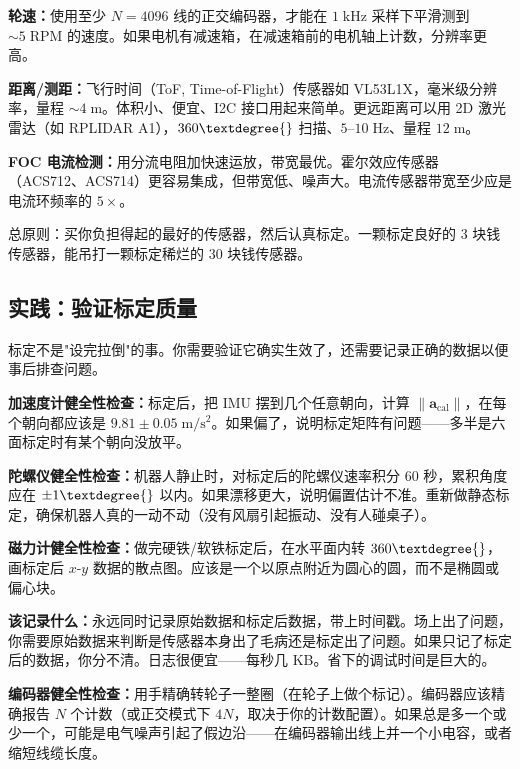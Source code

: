 \textbf{轮速：}使用至少 $N = 4096$ 线的正交编码器，才能在 $1\;\mathrm{kHz}$ 采样下平滑测到 $\sim\!5\;\mathrm{RPM}$ 的速度。如果电机有减速箱，在减速箱前的电机轴上计数，分辨率更高。

\textbf{距离/测距：}飞行时间（ToF, Time-of-Flight）传感器如 VL53L1X，毫米级分辨率，量程 $\sim\!4\;\mathrm{m}$。体积小、便宜、I2C 接口用起来简单。更远距离可以用 2D 激光雷达（如 RPLIDAR A1），$360\textdegree{}$ 扫描、$5$--$10\;\mathrm{Hz}$、量程 $12\;\mathrm{m}$。

\textbf{FOC 电流检测：}用分流电阻加快速运放，带宽最优。霍尔效应传感器（ACS712、ACS714）更容易集成，但带宽低、噪声大。电流传感器带宽至少应是电流环频率的 $5\times$。

总原则：买你负担得起的最好的传感器，然后认真标定。一颗标定良好的 3 块钱传感器，能吊打一颗标定稀烂的 30 块钱传感器。

\subsection{实践：验证标定质量}

标定不是"设完拉倒"的事。你需要验证它确实生效了，还需要记录正确的数据以便事后排查问题。

\textbf{加速度计健全性检查：}标定后，把 IMU 摆到几个任意朝向，计算 $\|\mathbf{a}_{\text{cal}}\|$，在每个朝向都应该是 $9.81 \pm 0.05\;\mathrm{m/s^2}$。如果偏了，说明标定矩阵有问题——多半是六面标定时有某个朝向没放平。

\textbf{陀螺仪健全性检查：}机器人静止时，对标定后的陀螺仪速率积分 60 秒，累积角度应在 $\pm 1\textdegree{}$ 以内。如果漂移更大，说明偏置估计不准。重新做静态标定，确保机器人真的一动不动（没有风扇引起振动、没有人碰桌子）。

\textbf{磁力计健全性检查：}做完硬铁/软铁标定后，在水平面内转 $360\textdegree{}$，画标定后 $x$-$y$ 数据的散点图。应该是一个以原点附近为圆心的圆，而不是椭圆或偏心块。

\textbf{该记录什么：}永远同时记录原始数据和标定后数据，带上时间戳。场上出了问题，你需要原始数据来判断是传感器本身出了毛病还是标定出了问题。如果只记了标定后的数据，你分不清。日志很便宜——每秒几 KB。省下的调试时间是巨大的。

\textbf{编码器健全性检查：}用手精确转轮子一整圈（在轮子上做个标记）。编码器应该精确报告 $N$ 个计数（或正交模式下 $4N$，取决于你的计数配置）。如果总是多一个或少一个，可能是电气噪声引起了假边沿——在编码器输出线上并一个小电容，或者缩短线缆长度。

